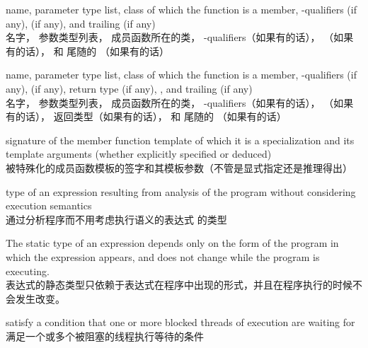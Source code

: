 %
name,
parameter type list,
class of which the function is a member,
\cv-qualifiers (if any),
 (if any),
and
trailing  (if any) \\
名字，
参数类型列表，
成员函数所在的类，
\cv-qualifiers（如果有的话），
（如果有的话），
和
尾随的 （如果有的话）

%
name,
parameter type list,
class of which the function is a member,
\cv-qualifiers (if any),
 (if any),
return type (if any),
,
and
trailing  (if any) \\
名字，
参数类型列表，
成员函数所在的类，
\cv-qualifiers（如果有的话），
（如果有的话），
返回类型（如果有的话），
和
尾随的 （如果有的话）

%
 signature of the member function template
of which it is a specialization and its template arguments (whether explicitly specified or deduced) \\
被特殊化的成员函数模板的签字和其模板参数（不管是显式指定还是推理得出）

%
type of an expression resulting from
analysis of the program without considering execution semantics \\
通过分析程序而不用考虑执行语义的表达式 的类型

\begin{defnote}
The static type of an expression depends only on the form of the program in
which the expression appears, and does not change while the program is 
executing. \\
表达式的静态类型只依赖于表达式在程序中出现的形式，并且在程序执行的时候不会发生改变。
\end{defnote}

%
satisfy a condition that one or more blocked threads of execution are waiting for \\
满足一个或多个被阻塞的线程执行等待的条件

